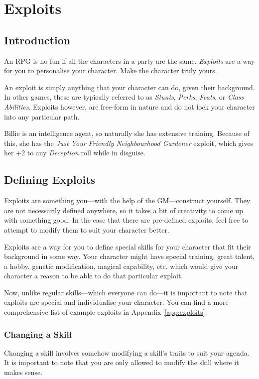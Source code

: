 \chapter{Exploits} \label{chap:exploits}
\section{Introduction}
An RPG is no fun if all the characters in a party are the same. 
\textit{Exploits} are a way for you to personalise your character. 
Make the character truly yours.

An exploit is simply anything that your character can do, given their background. In other games, these are typically referred to as \textit{Stunts}, \textit{Perks}, \textit{Feats}, or \textit{Class Abilities}.
Exploits however, are free-form in nature and do not lock your character into any particular path.

\begin{example}
    Billie is an intelligence agent, so naturally she has extensive training. 
    Because of this, she has the \textit{Just Your Friendly Neighbourhood Gardener} exploit, which gives her +2 to any \textit{Deception} roll while in disguise.
\end{example}

\section{Defining Exploits}

Exploits are something you---with the help of the GM---construct yourself. 
They are not necessarily defined anywhere, so it takes a bit of creativity to come up with something good.
In the case that there are pre-defined exploits, feel free to attempt to modify them to suit your character better.

Exploits are a way for you to define special skills for your character that fit their background in some way. 
Your character might have special training, great talent, a hobby, genetic modification, magical capability, etc. which would give your character a reason to be able to do that particular exploit.

Now, unlike regular skills---which everyone can do---it is important to note that exploits are special and individualise your character.
You can find a more comprehensive list of example exploits in Appendix~\ref{app:exploits}.

\subsection{Changing a Skill}
Changing a skill involves somehow modifying a skill's traits to suit your agenda. 
It is important to note that you are only allowed to modify the skill where it makes sense. 
